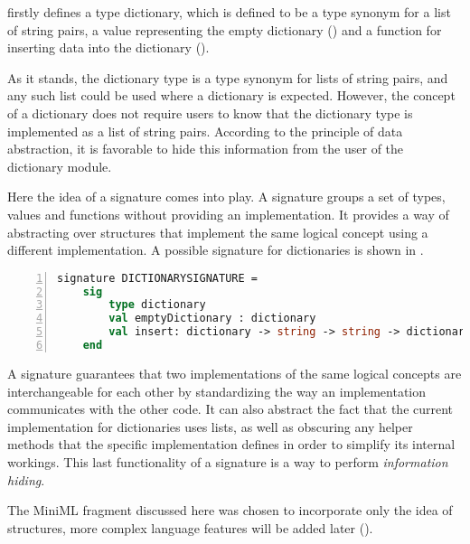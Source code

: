  firstly defines a type dictionary, which is defined to be a type synonym for a list of string pairs, a value representing the empty dictionary () and a function for inserting data into the dictionary ().

As it stands, the dictionary type is a type synonym for lists of string pairs, and any such list could be used where a dictionary is expected.
However, the concept of a dictionary does not require users to know that the dictionary type is implemented as a list of string pairs.
According to the principle of data abstraction, it is favorable to hide this information from the user of the dictionary module.

Here the idea of a signature comes into play.
A signature groups a set of types, values and functions without providing an implementation.
It provides a way of abstracting over structures that implement the same logical concept using a different implementation.
A possible signature for dictionaries is shown in .
~
\begin{lstlisting}[frame=single, language=ML, caption={[Dictionary Declaration Example]An example signature showing the declaration of a dictionary in ML.}, label=code:SignatureDictionaryExample, numbers=left]
signature DICTIONARYSIGNATURE =
    sig
        type dictionary
        val emptyDictionary : dictionary
        val insert: dictionary -> string -> string -> dictionary
    end
\end{lstlisting}

A signature guarantees that two implementations of the same logical concepts are interchangeable for each other by standardizing the way an implementation communicates with the other code.
It can also abstract the fact that the current implementation for dictionaries uses lists, as well as obscuring any helper methods that the specific implementation defines in order to simplify its internal workings.
This last functionality of a signature is a way to perform \emph{information hiding}.


The \mbox{MiniML} fragment discussed here was chosen to incorporate only the idea of structures, more complex language features will be added later ().

